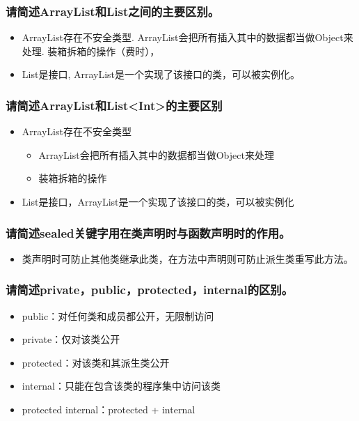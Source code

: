 \documentclass[9pt, b5paper]{article}
\begin{document}
\subsubsection{请简述ArrayList和List之间的主要区别。}
\label{sec:org2b59072}
\begin{itemize}
\item ArrayList存在不安全类型. ArrayList会把所有插入其中的数据都当做Object来处理. 装箱拆箱的操作（费时），
\item List是接口, ArrayList是一个实现了该接口的类，可以被实例化。
\end{itemize}
\subsubsection{请简述ArrayList和List<Int>的主要区别}
\label{sec:org5ad121f}
\begin{itemize}
\item ArrayList存在不安全类型
\begin{itemize}
\item ArrayList会把所有插入其中的数据都当做Object来处理
\item 装箱拆箱的操作
\end{itemize}
\item List是接口，ArrayList是一个实现了该接口的类，可以被实例化
\end{itemize}
\subsubsection{请简述sealed关键字用在类声明时与函数声明时的作用。}
\label{sec:orgb26dfcf}
\begin{itemize}
\item 类声明时可防止其他类继承此类，在方法中声明则可防止派生类重写此方法。
\end{itemize}
\subsubsection{请简述private，public，protected，internal的区别。}
\label{sec:org83c6262}
\begin{itemize}
\item public：对任何类和成员都公开，无限制访问
\item private：仅对该类公开
\item protected：对该类和其派生类公开
\item internal：只能在包含该类的程序集中访问该类
\item protected internal：protected + internal
\end{itemize}
\end{document}
